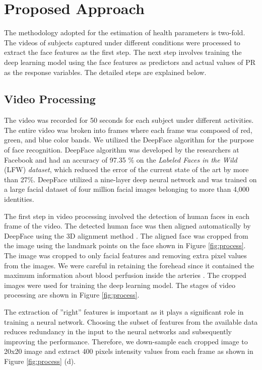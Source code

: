 \section{Proposed Approach}\label{sec:method}
The methodology adopted for the estimation of health parameters is two-fold.
The videos of subjects captured under different conditions were processed to extract the face features as the first step. The next step involves training the deep learning model using the face features as predictors and actual values of PR as the response variables. The detailed steps are explained below.
\subsection{ Video Processing}
The video was recorded for 50 seconds for each subject under different activities. The entire video was broken into frames where each frame was composed of red, green, and blue color bands. We utilized the DeepFace \cite{taigman2014deepface} algorithm for the purpose of face recognition. DeepFace algorithm was developed by the researchers at Facebook and had an accuracy of 97.35 \% on the \textit{Labeled Faces in the Wild} (LFW) \textit{dataset}, which reduced the error of the current state of the art \cite{huang2012learning,sun2013deep,cao2013practical,chen2013blessing} by more than 27\%. DeepFace utilized a nine-layer deep neural network and was trained on a large facial dataset of four million facial images belonging to more than 4,000 identities.

The first step in video processing involved the detection of human faces in each frame of the video. The detected human face was then aligned automatically by DeepFace using the 3D alignment method \cite{taigman2014deepface}. The aligned face was cropped from the image using the landmark points on the face shown in Figure \ref{fig:process}. The image was cropped  to only facial features and removing extra pixel values from the images. We were careful in retaining the forehead since it contained the maximum information about blood perfusion inside the arteries \cite{kumar2015distanceppg}. %
  The cropped images were used for training the deep learning model. The stages of video processing are shown in Figure \ref{fig:process}.   
  
  The extraction of ''right'' features is important as it plays a significant role in training a neural network.  Choosing the subset of features from the available data reduces redundancy in the input to the neural networks and subsequently improving the performance. Therefore, we down-sample each cropped image to 20x20 image and extract 400 pixels intensity values from each frame as shown in Figure \ref{fig:process} (d). 

